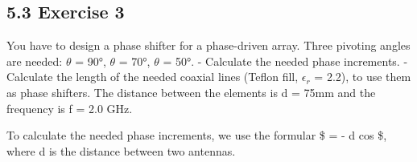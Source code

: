 \documentclass[
  letterpaper,
  DIV=11,
  numbers=noendperiod]{scrartcl}
\begin{document}
\subsection{5.3 Exercise 3}\label{exercise-3}

You have to design a phase shifter for a phase-driven array. Three
pivoting angles are needed: \(\theta\) = 90°, \(\theta\) = 70°,
\(\theta\) = 50°. - Calculate the needed phase increments. - Calculate
the length of the needed coaxial lines (Teflon fill, \(\epsilon_{r}\) =
2.2), to use them as phase shifters. The distance between the elements
is d = 75mm and the frequency is f = 2.0 GHz.

To calculate the needed phase increments, we use the formular \$
\Delta \phi = - \frac{2\pi}{\lambda} \cdot d \cdot cos \theta \$, where
d is the distance between two antennas.
\end{document}
